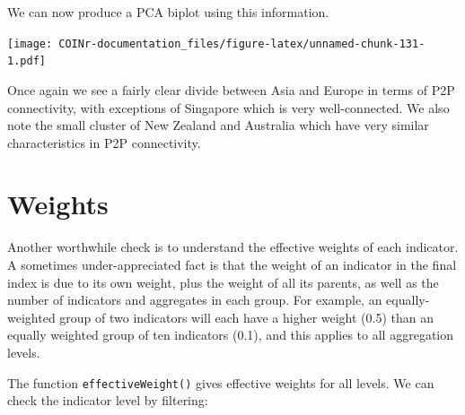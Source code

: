 \documentclass[
]{book}
\newenvironment{Shaded}{\begin{snugshade}}{\end{snugshade}}
\newcommand{\AttributeTok}[1]{\textcolor[rgb]{0.77,0.63,0.00}{#1}}
\newcommand{\CommentTok}[1]{\textcolor[rgb]{0.56,0.35,0.01}{\textit{#1}}}
\newcommand{\FunctionTok}[1]{\textcolor[rgb]{0.00,0.00,0.00}{#1}}
\newcommand{\NormalTok}[1]{#1}
\newcommand{\SpecialCharTok}[1]{\textcolor[rgb]{0.00,0.00,0.00}{#1}}
\begin{document}
We can now produce a PCA biplot using this information.

\begin{Shaded}
\end{Shaded}

\texttt{[image: COINr-documentation\_files/figure-latex/unnamed-chunk-131-1.pdf]}

Once again we see a fairly clear divide between Asia and Europe in terms of P2P connectivity, with exceptions of Singapore which is very well-connected. We also note the small cluster of New Zealand and Australia which have very similar characteristics in P2P connectivity.

\hypertarget{weights}{%
\section{Weights}\label{weights}}

Another worthwhile check is to understand the effective weights of each indicator. A sometimes under-appreciated fact is that the weight of an indicator in the final index is due to its own weight, plus the weight of all its parents, as well as the number of indicators and aggregates in each group. For example, an equally-weighted group of two indicators will each have a higher weight (0.5) than an equally weighted group of ten indicators (0.1), and this applies to all aggregation levels.

The function \texttt{effectiveWeight()} gives effective weights for all levels. We can check the indicator level by filtering:
\end{document}
